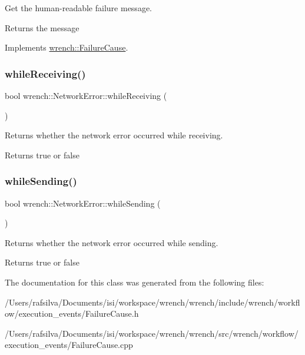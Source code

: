 Get the human-\/readable failure message. 

\begin{DoxyReturn}{Returns}
the message 
\end{DoxyReturn}


Implements \hyperlink{classwrench_1_1_failure_cause_afbad248ebe902409f2cd4f1d6f2b867d}{wrench\+::\+Failure\+Cause}.

\mbox{\label{classwrench_1_1_network_error_a1fa6782fde91dab538f577d2608eb640}} 
\subsubsection{\texorpdfstring{while\+Receiving()}{whileReceiving()}}
{\footnotesize\ttfamily bool wrench\+::\+Network\+Error\+::while\+Receiving (\begin{DoxyParamCaption}{ }\end{DoxyParamCaption})}



Returns whether the network error occurred while receiving. 

\begin{DoxyReturn}{Returns}
true or false 
\end{DoxyReturn}
\mbox{\label{classwrench_1_1_network_error_a98a2da5f34bd18fc2c245b364e884b34}} 
\subsubsection{\texorpdfstring{while\+Sending()}{whileSending()}}
{\footnotesize\ttfamily bool wrench\+::\+Network\+Error\+::while\+Sending (\begin{DoxyParamCaption}{ }\end{DoxyParamCaption})}



Returns whether the network error occurred while sending. 

\begin{DoxyReturn}{Returns}
true or false 
\end{DoxyReturn}


The documentation for this class was generated from the following files\+:\begin{DoxyCompactItemize}
\item 
/\+Users/rafsilva/\+Documents/isi/workspace/wrench/wrench/include/wrench/workflow/execution\+\_\+events/Failure\+Cause.\+h\item 
/\+Users/rafsilva/\+Documents/isi/workspace/wrench/wrench/src/wrench/workflow/execution\+\_\+events/Failure\+Cause.\+cpp\end{DoxyCompactItemize}
